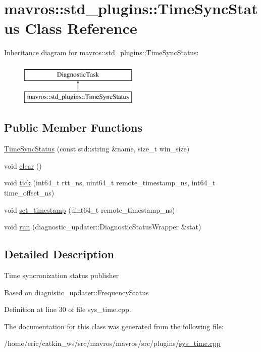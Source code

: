 \hypertarget{classmavros_1_1std__plugins_1_1TimeSyncStatus}{}\section{mavros\+::std\+\_\+plugins\+::Time\+Sync\+Status Class Reference}
\label{classmavros_1_1std__plugins_1_1TimeSyncStatus}
Inheritance diagram for mavros\+::std\+\_\+plugins\+::Time\+Sync\+Status\+:\begin{figure}[H]
\begin{center}
\leavevmode
\includegraphics[height=2.000000cm]{classmavros_1_1std__plugins_1_1TimeSyncStatus}
\end{center}
\end{figure}
\subsection*{Public Member Functions}
\begin{DoxyCompactItemize}
\item 
\mbox{\hyperlink{group__plugin_ga94f263b4d2d2ef123678bd7bbbc6b5cf}{Time\+Sync\+Status}} (const std\+::string \&name, size\+\_\+t win\+\_\+size)
\item 
void \mbox{\hyperlink{group__plugin_ga4a6b530e0d59561986622eda95b86938}{clear}} ()
\item 
void \mbox{\hyperlink{group__plugin_gafa1a86312af75fd2ad8338575a104b5f}{tick}} (int64\+\_\+t rtt\+\_\+ns, uint64\+\_\+t remote\+\_\+timestamp\+\_\+ns, int64\+\_\+t time\+\_\+offset\+\_\+ns)
\item 
void \mbox{\hyperlink{group__plugin_gafb645e825e6162348a94b8e62d6cc9cd}{set\+\_\+timestamp}} (uint64\+\_\+t remote\+\_\+timestamp\+\_\+ns)
\item 
void \mbox{\hyperlink{group__plugin_gac53ce1e6ed02e01c3a2db41478d69452}{run}} (diagnostic\+\_\+updater\+::\+Diagnostic\+Status\+Wrapper \&stat)
\end{DoxyCompactItemize}


\subsection{Detailed Description}
Time syncronization status publisher

Based on diagnistic\+\_\+updater\+::\+Frequency\+Status 

Definition at line 30 of file sys\+\_\+time.\+cpp.



The documentation for this class was generated from the following file\+:\begin{DoxyCompactItemize}
\item 
/home/eric/catkin\+\_\+ws/src/mavros/mavros/src/plugins/\mbox{\hyperlink{sys__time_8cpp}{sys\+\_\+time.\+cpp}}\end{DoxyCompactItemize}
